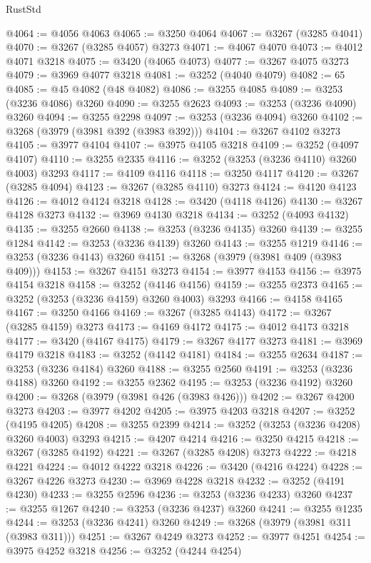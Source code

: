 \begin{lexlean}{RustStd}
\begin{coremodule}
@4064 := @4056 @4063
@4065 := @3250 @4064
@4067 := @3267 (@3285 @4041)
@4070 := @3267 (@3285 @4057) @3273
@4071 := @4067 @4070
@4073 := @4012 @4071 @3218
@4075 := @3420 (@4065 @4073)
@4077 := @3267 @4075 @3273
@4079 := @3969 @4077 @3218
@4081 := @3252 (@4040 @4079)
@4082 := 65
@4085 := @45 @4082 (@48 @4082)
@4086 := @3255 @4085
@4089 := @3253 (@3236 @4086) @3260
@4090 := @3255 @2623
@4093 := @3253 (@3236 @4090) @3260
@4094 := @3255 @2298
@4097 := @3253 (@3236 @4094) @3260
@4102 := @3268 (@3979 (@3981 @392 (@3983 @392)))
@4104 := @3267 @4102 @3273
@4105 := @3977 @4104
@4107 := @3975 @4105 @3218
@4109 := @3252 (@4097 @4107)
@4110 := @3255 @2335
@4116 := @3252 (@3253 (@3236 @4110) @3260 @4003) @3293
@4117 := @4109 @4116
@4118 := @3250 @4117
@4120 := @3267 (@3285 @4094)
@4123 := @3267 (@3285 @4110) @3273
@4124 := @4120 @4123
@4126 := @4012 @4124 @3218
@4128 := @3420 (@4118 @4126)
@4130 := @3267 @4128 @3273
@4132 := @3969 @4130 @3218
@4134 := @3252 (@4093 @4132)
@4135 := @3255 @2660
@4138 := @3253 (@3236 @4135) @3260
@4139 := @3255 @1284
@4142 := @3253 (@3236 @4139) @3260
@4143 := @3255 @1219
@4146 := @3253 (@3236 @4143) @3260
@4151 := @3268 (@3979 (@3981 @409 (@3983 @409)))
@4153 := @3267 @4151 @3273
@4154 := @3977 @4153
@4156 := @3975 @4154 @3218
@4158 := @3252 (@4146 @4156)
@4159 := @3255 @2373
@4165 := @3252 (@3253 (@3236 @4159) @3260 @4003) @3293
@4166 := @4158 @4165
@4167 := @3250 @4166
@4169 := @3267 (@3285 @4143)
@4172 := @3267 (@3285 @4159) @3273
@4173 := @4169 @4172
@4175 := @4012 @4173 @3218
@4177 := @3420 (@4167 @4175)
@4179 := @3267 @4177 @3273
@4181 := @3969 @4179 @3218
@4183 := @3252 (@4142 @4181)
@4184 := @3255 @2634
@4187 := @3253 (@3236 @4184) @3260
@4188 := @3255 @2560
@4191 := @3253 (@3236 @4188) @3260
@4192 := @3255 @2362
@4195 := @3253 (@3236 @4192) @3260
@4200 := @3268 (@3979 (@3981 @426 (@3983 @426)))
@4202 := @3267 @4200 @3273
@4203 := @3977 @4202
@4205 := @3975 @4203 @3218
@4207 := @3252 (@4195 @4205)
@4208 := @3255 @2399
@4214 := @3252 (@3253 (@3236 @4208) @3260 @4003) @3293
@4215 := @4207 @4214
@4216 := @3250 @4215
@4218 := @3267 (@3285 @4192)
@4221 := @3267 (@3285 @4208) @3273
@4222 := @4218 @4221
@4224 := @4012 @4222 @3218
@4226 := @3420 (@4216 @4224)
@4228 := @3267 @4226 @3273
@4230 := @3969 @4228 @3218
@4232 := @3252 (@4191 @4230)
@4233 := @3255 @2596
@4236 := @3253 (@3236 @4233) @3260
@4237 := @3255 @1267
@4240 := @3253 (@3236 @4237) @3260
@4241 := @3255 @1235
@4244 := @3253 (@3236 @4241) @3260
@4249 := @3268 (@3979 (@3981 @311 (@3983 @311)))
@4251 := @3267 @4249 @3273
@4252 := @3977 @4251
@4254 := @3975 @4252 @3218
@4256 := @3252 (@4244 @4254)

\end{coremodule}
\end{lexlean}
